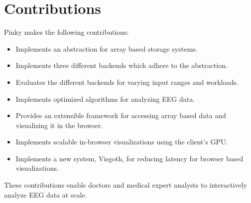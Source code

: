 \section{Contributions}

Pinky makes the following contributions:

\begin{itemize}

  \item Implements an abstraction for array based storage systems.

  \item Implements three different backends which adhere to the abstraction.

  \item Evaluates the different backends for varying input ranges and
    workloads.

  \item Implements optimized algorithms for analyzing EEG data.

  \item Provides an extensible framework for accessing array based data and
    visualizing it in the browser.

  \item Implements scalable in-browser visualizations using the client's GPU.

  \item Implements a new system, Visgoth, for reducing latency for browser
    based visualizations.

\end{itemize}

These contributions enable doctors and medical expert analysts to interactively
analyze EEG data at scale.

